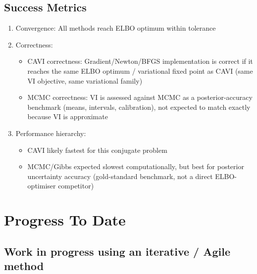 \documentclass[11pt]{article}
\begin{document}
\subsection*{Success Metrics}

\begin{enumerate}
\item Convergence: All methods reach ELBO optimum within tolerance
\item Correctness:
\begin{itemize}
\item CAVI correctness: Gradient/Newton/BFGS implementation is correct if it reaches the same ELBO optimum / variational fixed point as CAVI (same VI objective, same variational family)
\item MCMC correctness: VI is assessed against MCMC as a posterior-accuracy benchmark (means, intervals, calibration), not expected to match exactly because VI is approximate
\end{itemize}
\item Performance hierarchy:
\begin{itemize} 
\item CAVI likely fastest for this conjugate problem
\item MCMC/Gibbs expected slowest computationally, but best for posterior uncertainty accuracy (gold-standard benchmark, not a direct ELBO-optimiser competitor)
\end{itemize}
 
\end{enumerate}
 
\section*{Progress To Date}

\subsection*{Work in progress using an iterative / Agile method}
\end{document}
